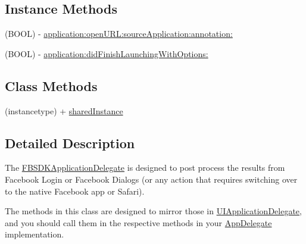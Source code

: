 \subsection*{Instance Methods}
\begin{DoxyCompactItemize}
\item 
(B\-O\-O\-L) -\/ \hyperlink{interface_f_b_s_d_k_application_delegate_ab2a10892909e3ffa759a8bc854601de6}{application\-:open\-U\-R\-L\-:source\-Application\-:annotation\-:}
\item 
(B\-O\-O\-L) -\/ \hyperlink{interface_f_b_s_d_k_application_delegate_aa5477a6512bacb13b5f485027a2b4c53}{application\-:did\-Finish\-Launching\-With\-Options\-:}
\end{DoxyCompactItemize}
\subsection*{Class Methods}
\begin{DoxyCompactItemize}
\item 
(instancetype) + \hyperlink{interface_f_b_s_d_k_application_delegate_ad9db7fbd72d8cccf675e91ee9fba2ee1}{shared\-Instance}
\end{DoxyCompactItemize}


\subsection{Detailed Description}
The \hyperlink{interface_f_b_s_d_k_application_delegate}{F\-B\-S\-D\-K\-Application\-Delegate} is designed to post process the results from Facebook Login or Facebook Dialogs (or any action that requires switching over to the native Facebook app or Safari).

The methods in this class are designed to mirror those in \hyperlink{class_u_i_application_delegate-p}{U\-I\-Application\-Delegate}, and you should call them in the respective methods in your \hyperlink{interface_app_delegate}{App\-Delegate} implementation. 

